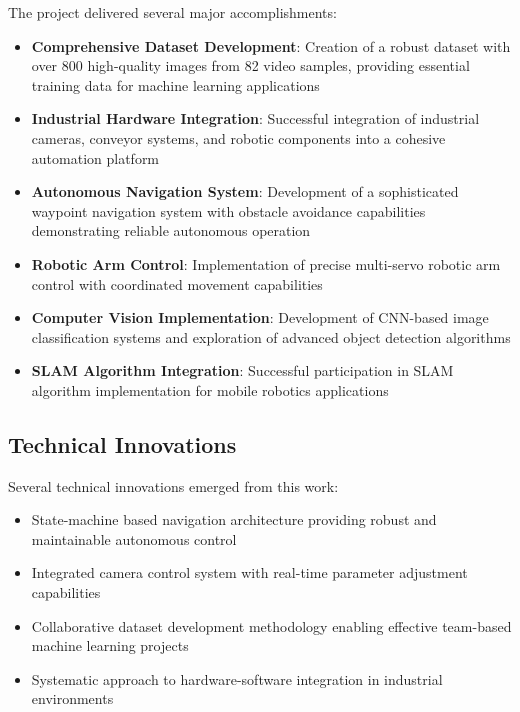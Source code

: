 \documentclass{book}
\begin{document}
\par\noindent The project delivered several major accomplishments:

\begin{itemize}
\item \textbf{Comprehensive Dataset Development}: Creation of a robust dataset with over 800 high-quality images from 82 video samples, providing essential training data for machine learning applications
\item \textbf{Industrial Hardware Integration}: Successful integration of industrial cameras, conveyor systems, and robotic components into a cohesive automation platform
\item \textbf{Autonomous Navigation System}: Development of a sophisticated waypoint navigation system with obstacle avoidance capabilities demonstrating reliable autonomous operation
\item \textbf{Robotic Arm Control}: Implementation of precise multi-servo robotic arm control with coordinated movement capabilities
\item \textbf{Computer Vision Implementation}: Development of CNN-based image classification systems and exploration of advanced object detection algorithms
\item \textbf{SLAM Algorithm Integration}: Successful participation in SLAM algorithm implementation for mobile robotics applications
\end{itemize}

\subsection{Technical Innovations}

\par\noindent Several technical innovations emerged from this work:

\begin{itemize}
\item State-machine based navigation architecture providing robust and maintainable autonomous control
\item Integrated camera control system with real-time parameter adjustment capabilities
\item Collaborative dataset development methodology enabling effective team-based machine learning projects
\item Systematic approach to hardware-software integration in industrial environments
\end{itemize}
\end{document}
